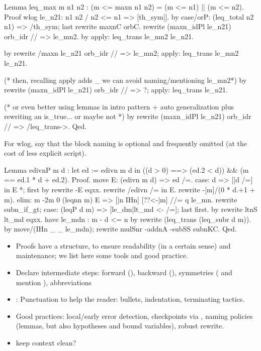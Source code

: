\begin{coq}{}{}
Lemma leq_max m n1 n2 : (m <= maxn n1 n2) = (m <= n1) || (m <= n2).
Proof
wlog le_n21: n1 n2 / n2 <= n1 => [th_sym|].
  by case/orP: (leq_total n2 n1) => /th_sym; last rewrite maxnC orbC.
rewrite (maxn_idPl le_n21) orb_idr // => le_mn2.
by apply: leq_trans le_mn2 le_n21.

by rewrite /maxn le_n21 orb_idr // => le_mn2; apply: leq_trans le_mn2 le_n21.

(* then, recalling apply adds _ we can avoid naming/mentioning le_mn2*)
by rewrite (maxn_idPl le_n21) orb_idr // => ?; apply: leq_trans le_n21.

(* or even better using lemmas in intro pattern + auto generalization
   plus rewriting an is_true... or maybe not *)
by rewrite (maxn_idPl le_n21) orb_idr // => /leq_trans->.
Qed.
\end{coq}

For wlog, say that the block naming  is optional and frequently
omitted (at the cost of less explicit script).

\begin{coq}{}{}
Lemma edivnP m d :
 let ed := edivn m d in
   ((d > 0) ==> (ed.2 < d)) && (m == ed.1 * d + ed.2).
Proof.
move E: (edivn m d) => ed /=.
case: d => [|d /=] in E *; first by rewrite -E eqxx.
rewrite /edivn /= in E.
rewrite -[m]/(0 * d.+1 + m).
elim: m {-2}m 0 (leqnn m) E => [|n IHn] [??<-|m] //= q le_mn.
rewrite subn_if_gt; case: (leqP d m) => [le_dm|lt_md <- /=]; last first.
  by rewrite ltnS lt_md eqxx.
have le_mdn : m - d <= n by rewrite (leq_trans (leq_subr d m)).
by move/(IHn _ _ le_mdn); rewrite mulSnr -addnA -subSS subnKC.
Qed.
\end{coq}

\begin{itemize}
\item Proofs have a structure, to ensure readability (in a certain
  sense) and maintenance; we list here some tools and good practice.
\item Declare intermediate steps: forward (), backward
  (), symmetries ( and mention ),
abbreviations 
\item: Punctuation to help the reader: bullets, indentation,
  terminating tactics.
\item Good practices: local/early error detection, checkpoints via
  , naming policies (lemmas, but also hypotheses and bound
  variables), robust rewrite.
\item keep context clean?
\end{itemize}

